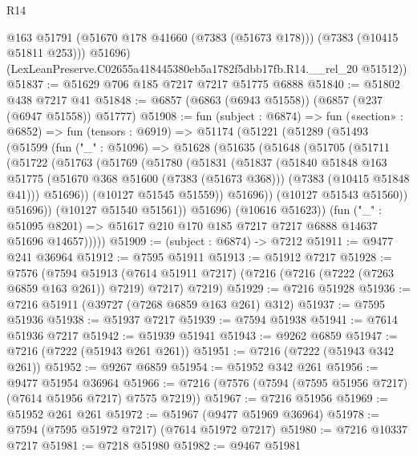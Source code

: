 \begin{lexlean}{R14}
\begin{coremodule}
          @163
          @51791
          (@51670 @178 @41660 (@7383 (@51673 @178)))
          (@7383 (@10415 @51811 @253)))
        @51696)
      (LexLeanPreserve.C02655a418445380eb5a1782f5dbb17fb.R14.__rel_20 @51512))
@51837 := @51629 @706 @185 @7217 @7217 @51775 @6888
@51840 := @51802 @438 @7217 @41
@51848 := @6857 (@6863 (@6943 @51558)) (@6857 (@237 (@6947 @51558)) @51777)
@51908 := fun (subject : @6874) =>
  fun («section» : @6852) =>
  fun (tensors : @6919) =>
  @51174
    (@51221
      (@51289
        (@51493
          (@51599
            (fun ("_" : @51096) =>
            @51628
              (@51635
                (@51648
                  (@51705
                    (@51711
                      (@51722
                        (@51763
                          (@51769
                            (@51780
                              (@51831
                                (@51837
                                  (@51840
                                    @51848
                                    @163
                                    @51775
                                    (@51670 @368 @51600 (@7383 (@51673 @368)))
                                    (@7383 (@10415 @51848 @41)))
                                  @51696))
                              (@10127 @51545 @51559))
                            @51696))
                        (@10127 @51543 @51560))
                      @51696))
                  (@10127 @51540 @51561))
                @51696)
              (@10616 @51623))
            (fun ("_" : @51095 @8201) =>
            @51617 @210 @170 @185 @7217 @7217 @6888 @14637 @51696 @14657)))))
@51909 := (subject : @6874) -> @7212
@51911 := @9477 @241 @36964
@51912 := @7595 @51911
@51913 := @51912 @7217
@51928 := @7576
    (@7594
      @51913
      (@7614 @51911 @7217)
      (@7216 (@7216 (@7222 (@7263 @6859 @163 @261)) @7219) @7217)
      @7219)
@51929 := @7216 @51928
@51936 := @7216 @51911 (@39727 (@7268 @6859 @163 @261) @312)
@51937 := @7595 @51936
@51938 := @51937 @7217
@51939 := @7594 @51938
@51941 := @7614 @51936 @7217
@51942 := @51939 @51941
@51943 := @9262 @6859
@51947 := @7216 (@7222 (@51943 @261 @261))
@51951 := @7216 (@7222 (@51943 @342 @261))
@51952 := @9267 @6859
@51954 := @51952 @342 @261
@51956 := @9477 @51954 @36964
@51966 := @7216 (@7576 (@7594 (@7595 @51956 @7217) (@7614 @51956 @7217) @7575 @7219))
@51967 := @7216 @51956
@51969 := @51952 @261 @261
@51972 := @51967 (@9477 @51969 @36964)
@51978 := @7594 (@7595 @51972 @7217) (@7614 @51972 @7217)
@51980 := @7216 @10337 @7217
@51981 := @7218 @51980
@51982 := @9467 @51981

\end{coremodule}
\end{lexlean}
